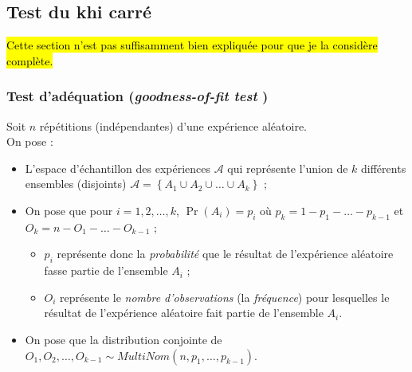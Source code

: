 \documentclass[10pt, french]{article}
\begin{document}
\begin{multicols*}{2}


\columnbreak
\subsection{Test du khi carré}
\hl{Cette section n'est pas suffisamment bien expliquée pour que je la considère complète.}\\

\subsubsection{Test d'adéquation (\og \textit{goodness-of-fit test} \fg{})}
Soit $n$ répétitions (indépendantes) d'une expérience aléatoire.\\
On pose :
\begin{itemize}
	\item	L'espace d'échantillon des expériences $\mathcal{A}$ qui représente l'union de $k$ différents ensembles (disjoints) $\mathcal{A}	=	\left\{A_{1} \cup A_{2} \cup \dots \cup A_{k} \right\}$ ;
	\item	On pose que pour $i	=	1, 2, \dots, k$, $\Pr(A_{i})	=	p_{i}$ où $p_{k}	=	1	-	p_{1}	-	\hdots	-	p_{k - 1}$ et $O_{k}	=	n	-	O_{1}	-	\hdots	-	O_{k - 1}$ ;
		\begin{itemize}
		\item	$p_{i}$ représente donc la \textit{probabilité} que le résultat de l'expérience aléatoire fasse partie de l'ensemble $A_{i}$ ;
		\item	$O_{i}$	représente le \textit{nombre d'observations} (la \textit{fréquence}) pour lesquelles le résultat de l'expérience aléatoire fait partie de l'ensemble $A_{i}$.
		\end{itemize}
	\item	On pose que la distribution conjointe de $O_{1}, O_{2}, \dots, O_{k - 1} \sim MultiNom(n, p_{1}, \dots, p_{k - 1})$.
\end{itemize}


\end{multicols*}
\end{document}
